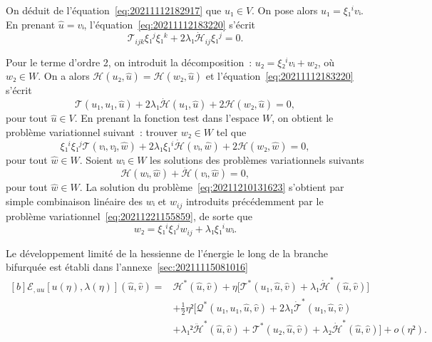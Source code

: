 \documentclass[12pt, final]{amsart}
\begin{document}
On déduit de l'équation~\eqref{eq:20211112182917} que \(u₁∈V\). On pose alors
\(u₁=ξ₁^i vᵢ\). En prenant \(\hat{u}=vᵢ\), l'équation~\eqref{eq:20211112183220}
s'écrit
\begin{equation}
  𝒯_{ijk}ξ₁^jξ₁^k+2λ₁\dot{ℋ}_{ij}ξ₁^j=0.
\end{equation}

Pour le terme d'ordre 2, on introduit la décomposition~: \(u₂=ξ₂^ivᵢ+w₂\), où
\(w₂∈W\). On a alors \(ℋ(u₂, \hat{u})=ℋ(w₂, \hat{u})\) et
l'équation~\eqref{eq:20211112183220} s'écrit
\begin{equation}
  𝒯(u₁, u₁, \hat{u})+2λ₁\dot{ℋ}(u₁, \hat{u})
  +2ℋ(w₂, \hat{u})=0,
\end{equation}
pour tout \(\hat{u}∈V\). En prenant la fonction test dans l'espace \(W\), on
obtient le problème variationnel suivant~: trouver \(w₂∈W\) tel
que
\begin{equation}
  \label{eq:20211210131623}
  ξ₁^iξ₁^j𝒯(vᵢ, vⱼ, \hat{w})
  +2λ₁ξ₁^i\dot{ℋ}(vᵢ, \hat{w})
  +2ℋ(w₂, \hat{w})=0,
\end{equation}
pour tout \(\hat{w}∈W\). Soient \(wᵢ∈W\) les solutions des problèmes
variationnels suivants
\begin{equation}
  ℋ(wᵢ, \hat{w})+\dot{ℋ}(vᵢ, \hat{w})=0,
\end{equation}
pour tout \(\hat{w}∈W\). La solution du problème~\eqref{eq:20211210131623}
s'obtient par simple combinaison linéaire des \(wᵢ\) et \(w_{ij}\) introduits
précédemment par le problème variationnel~\eqref{eq:20211221155859}, de sorte
que
\begin{equation}
  w₂=ξ₁^iξ₁^jw_{ij}+λ₁ξ₁^i wᵢ.
\end{equation}

Le développement limité de la hessienne de l'énergie le long de la branche
bifurquée est établi dans l'annexe~\ref{sec:20211115081016}
\begin{equation}
  \label{eq:20211115082025}
  \begin{aligned}[b]
    ℰ_{,uu}[u(η), λ(η)](\hat{u}, \hat{v})
    ={}&ℋ^*(\hat{u}, \hat{v})+η\bigl[𝒯^*(u₁, \hat{u}, \hat{v})
    +λ₁\dot{ℋ}^*(\hat{u}, \hat{v})\bigr]\\
    &+\tfrac12η²\bigl[𝒬^*(u₁, u₁, \hat{u}, \hat{v})
    +2λ₁\dot{𝒯}^*(u₁, \hat{u}, \hat{v})\\
    &+λ₁²\ddot{ℋ}^*(\hat{u}, \hat{v})+𝒯^*(u₂, \hat{u}, \hat{v})
    +λ₂\dot{ℋ}^*(\hat{u}, \hat{v})\bigr]+o(η²).
  \end{aligned}
\end{equation}
\end{document}
